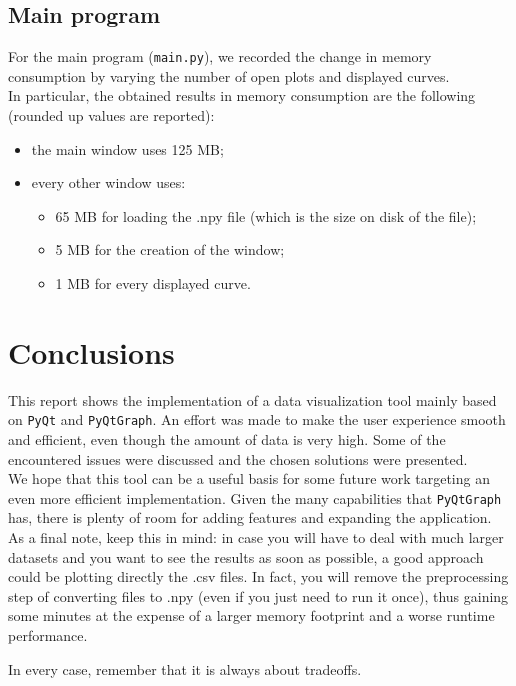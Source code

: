 \documentclass[11pt,a4paper]{article}
\begin{document}
\subsection{Main program}

For the main program (\texttt{main.py}), we recorded the change in memory consumption by varying the number of open plots and displayed curves.\\

In particular, the obtained results in memory consumption are the following (rounded up values are reported):
\begin{itemize}
    \item the main window uses 125 MB;
    \item every other window uses:
    \begin{itemize}
    		\item 65 MB for loading the .npy file (which is the size on disk of the file);
    		\item 5 MB for the creation of the window;
    		\item 1 MB for every displayed curve.
	\end{itemize}
\end{itemize}


\section{Conclusions}
\label{sec:conclusions}

This report shows the implementation of a data visualization tool mainly based on \texttt{PyQt} and \texttt{PyQtGraph}.
An effort was made to make the user experience smooth and efficient, even though the amount of data is very high.
Some of the encountered issues were discussed and the chosen solutions were presented.\\

We hope that this tool can be a useful basis for some future work targeting an even more efficient implementation.
Given the many capabilities that \texttt{PyQtGraph} has, there is plenty of room for adding features and expanding the application.\\

As a final note,  keep this in mind: in case you will have to deal with much larger datasets and you want to see the results as soon as possible, a good approach could be plotting directly the .csv files.
In fact, you will remove the preprocessing step of converting files to .npy (even if you just need to run it once), thus gaining some minutes at the expense of a larger memory footprint and a worse runtime performance.

In every case, remember that it is always about tradeoffs.

\end{document}
